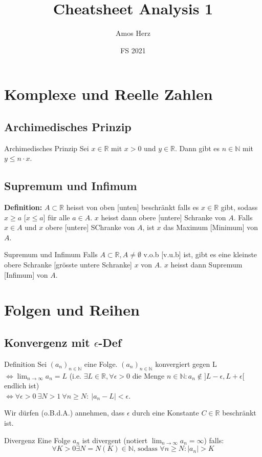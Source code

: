 \documentclass[a4paper,8pt]{extarticle}
\title{\vspace{-1cm}Cheatsheet Analysis 1\vspace{-0.75cm}}
\author{Amos Herz\vspace{-0.5cm}}
\date{FS 2021}
\newenvironment{definition}{
   \noindent \textbf{Definition:  }}{}
\def\R{\mathbb{R}}
\def\N{\mathbb{N}}
\begin{document}
\section{Komplexe und Reelle Zahlen}
\subsection{Archimedisches Prinzip}
\begin{mainbox}{Archimedisches Prinzip}
  Sei $x \in \R$ mit $x > 0$ und $y \in \R$. Dann gibt es $n \in \N$ mit $y \leq n \cdot x$.
\end{mainbox}

\subsection{Supremum und Infimum}
\begin{definition}
  $A \subset \R$ heisst von oben [unten] beschränkt falls es $x \in \R$ gibt, sodass $x \geq a$ [$x \leq a$] für alle $a \in A$. $x$ heisst dann obere [untere] Schranke von $A$. Falls $x\in A$ und $x$ obere [untere] SChranke von $A$, ist $x$ das Maximum [Minimum] von $A$.
\end{definition}
\begin{mainbox}{Supremum und Infimum}
  Falls $A \subset \R, A \neq \emptyset$ v.o.b [v.u.b] ist, gibt es eine kleinste obere Schranke [grösste untere Schranke] $x$ von $A$. $x$ heisst dann Supremum [Infimum] von $A$.
\end{mainbox}

\section{Folgen und Reihen}
\subsection{Konvergenz mit $\epsilon$-Def}
\begin{mainbox}{Definition}
  Sei $(a_n)_{n\in \mathbb{N}}$ eine Folge. $(a_n)_{n\in \mathbb{N}}$ konvergiert gegen L \\ $\iff \lim_{n \to \infty} a_n = L $ (i.e. $\exists L \in \R, \forall \epsilon > 0$ die Menge ${n \in \N: a_n \notin ]L - \epsilon, L + \epsilon[}$ endlich ist)\\ $\iff \forall \epsilon > 0 \ \exists N > 1 \ \forall n \ge N : \ | a_n - L | < \epsilon$.
\end{mainbox}
Wir dürfen (o.B.d.A.) annehmen, dass $\epsilon$ durch eine Konstante $C \in \R$ beschränkt ist.
\begin{subbox}{Divergenz}
  Eine Folge $a_n$ ist divergent (notiert $\lim_{n \to \infty} a_n = \infty$) falls: $$\forall K > 0 \exists N = N(K) \in \N \text{, sodass } \forall n \geq N: |a_n| > K$$
\end{subbox}
\end{document}
